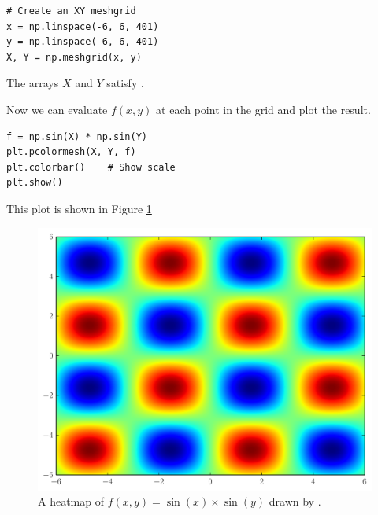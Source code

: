 \begin{lstlisting}
# Create an XY meshgrid
x = np.linspace(-6, 6, 401)
y = np.linspace(-6, 6, 401)
X, Y = np.meshgrid(x, y)
\end{lstlisting}
The arrays $X$ and $Y$ satisfy .

Now we can evaluate $f(x,y)$ at each point in the grid and plot the result.

\begin{lstlisting}
f = np.sin(X) * np.sin(Y)
plt.pcolormesh(X, Y, f)
plt.colorbar()    # Show scale
plt.show()
\end{lstlisting}
This plot is shown in Figure \ref{fig:pcmexample}

\begin{figure} %
\includegraphics[width=.7\textwidth]{sinxsiny.png}
\caption{A heatmap of $f(x,y)=\sin\left(x\right)\times\sin\left(y\right)$ drawn by .}
\label{fig:pcmexample}
\end{figure}


